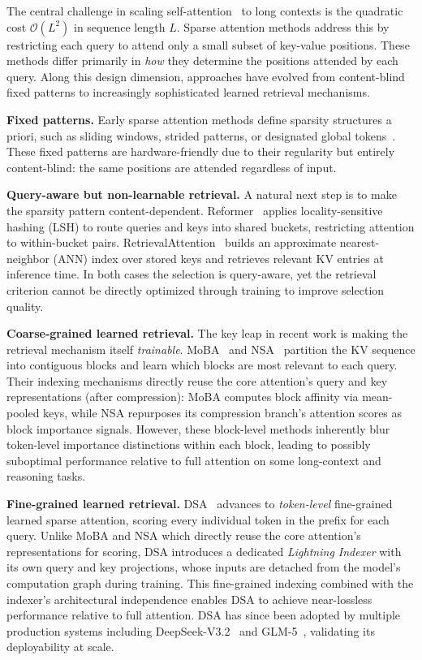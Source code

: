 \documentclass{article}
\begin{document}
The central challenge in scaling self-attention~\citep{vaswani2017attention} to long contexts is the quadratic cost $\mathcal{O}(L^2)$ in sequence length $L$. Sparse attention methods address this by restricting each query to attend only a small subset of key-value positions. These methods differ primarily in \emph{how} they determine the positions attended by each query. Along this design dimension, approaches have evolved from content-blind fixed patterns to increasingly sophisticated learned retrieval mechanisms.

\textbf{Fixed patterns.} Early sparse attention methods define sparsity structures a priori, such as sliding windows, strided patterns, or designated global tokens~\citep{child2019sparse, beltagy2020longformer, zaheer2020bigbird}. These fixed patterns are hardware-friendly due to their regularity but entirely content-blind: the same positions are attended regardless of input.

\textbf{Query-aware but non-learnable retrieval.} A natural next step is to make the sparsity pattern content-dependent. Reformer~\citep{kitaev2020reformer} applies locality-sensitive hashing (LSH) to route queries and keys into shared buckets, restricting attention to within-bucket pairs. RetrievalAttention~\citep{liu2024retrievalattention} builds an approximate nearest-neighbor (ANN) index over stored keys and retrieves relevant KV entries at inference time. In both cases the selection is query-aware, yet the retrieval criterion cannot be directly optimized through training to improve selection quality.

\textbf{Coarse-grained learned retrieval.} The key leap in recent work is making the retrieval mechanism itself \emph{trainable}. MoBA~\citep{lu2025moba} and NSA~\citep{yuan2025nsa} partition the KV sequence into contiguous blocks and learn which blocks are most relevant to each query. Their indexing mechanisms directly reuse the core attention's query and key representations (after compression): MoBA computes block affinity via mean-pooled keys, while NSA repurposes its compression branch's attention scores as block importance signals. However, these block-level methods inherently blur token-level importance distinctions within each block, leading to possibly suboptimal performance relative to full attention on some long-context and reasoning tasks.

\textbf{Fine-grained learned retrieval.} DSA~\citep{deepseek2025dsa} advances to \emph{token-level} fine-grained learned sparse attention, scoring every individual token in the prefix for each query. Unlike MoBA and NSA which directly reuse the core attention's representations for scoring, DSA introduces a dedicated \emph{Lightning Indexer} with its own query and key projections, whose inputs are detached from the model's computation graph during training. This fine-grained indexing combined with the indexer's architectural independence enables DSA to achieve near-lossless performance relative to full attention. DSA has since been adopted by multiple production systems including DeepSeek-V3.2~\citep{deepseek2025v32, deepseek2025dsa} and GLM-5~\citep{zeng2026glm5}, validating its deployability at scale. 
\end{document}
